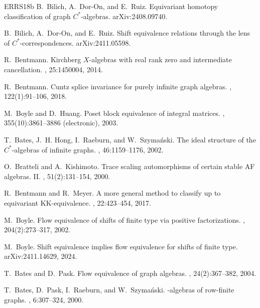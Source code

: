\documentclass[12pt]{amsbook}%
\theoremstyle{defin}
\theoremstyle{remark}
\numberwithin{equation}{chapter}
\numberwithin{theor}{section}
\begin{document}
\begin{thebibliography}{ERRS18b}
B.~Bilich, A.~Dor-On, and E.~Ruiz.
\newblock Equivariant homotopy classification of graph {$C^*$}-algebras.
\newblock arXiv:2408.09740.

B.~Bilich, A.~Dor-On, and E.~Ruiz.
\newblock Shift equivalence relations through the lens of
  {$C^*$}-correspondences.
\newblock arXiv:2411.05598.

R.~Bentmann.
\newblock Kirchberg {$X$}-algebras with real rank zero and intermediate
  cancellation.
, 25:1450004, 2014.

R.~Bentmann.
\newblock Cuntz splice invariance for purely infinite graph algebras.
, 122(1):91--106, 2018.

M.~Boyle and D.~Huang.
\newblock Poset block equivalence of integral matrices.
, 355(10):3861--3886 (electronic), 2003.

T.~Bates, J.~H. Hong, I.~Raeburn, and W.~Szyma\'nski.
\newblock The ideal structure of the {$C^*$}-algebras of infinite graphs.
, 46:1159--1176, 2002.

O.~Bratteli and A.~Kishimoto.
\newblock Trace scaling automorphisms of certain stable {AF} algebras. {II}.
, 51(2):131--154, 2000.

R.~Bentmann and R.~Meyer.
\newblock A more general method to classify up to equivariant {KK}-equivalence.
, 22:423--454, 2017.

M.~Boyle.
\newblock Flow equivalence of shifts of finite type via positive
  factorizations.
, 204(2):273--317, 2002.

M.~Boyle.
\newblock Shift equivalence implies flow equivalence for shifts of finite type.
\newblock arXiv:2411.14629, 2024.

T.~Bates and D.~Pask.
\newblock Flow equivalence of graph algebras.
, 24(2):367--382, 2004.

T.~Bates, D.~Pask, I.~Raeburn, and W.~Szyma\'nski.
-algebras of row-finite graphs.
, 6:307--324, 2000.


\end{thebibliography}
\end{document}
